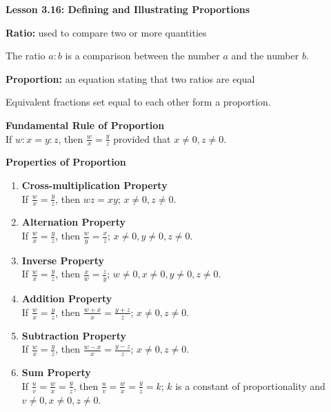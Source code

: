 \begin{center}
\textbf{Lesson 3.16: Defining and Illustrating Proportions}
\end{center}

\vspace*{-1.5ex}

\noindent \textbf{Ratio:} used to compare two or more quantities

The ratio \(a:b\) is a comparison between the number \(a\) and the number \(b\).

\noindent \textbf{Proportion:} an equation stating that two ratios are equal

Equivalent fractions set equal to each other form a proportion. 

\noindent\textbf{Fundamental Rule of Proportion}\\
If \( w : x = y : z \), then \( \tfrac{w}{x} = \tfrac{y}{z} \) provided that \( x \neq 0, z \neq 0 \).

\noindent\textbf{Properties of Proportion}
\begin{enumerate}
    \item \textbf{Cross-multiplication Property}\\
    If \( \tfrac{w}{x} = \tfrac{y}{z} \), then \( wz = xy \); \( x \neq 0, z \neq 0 \).

    \item \textbf{Alternation Property}\\
    If \( \tfrac{w}{x} = \tfrac{y}{z} \), then \( \tfrac{w}{y} = \tfrac{x}{z} \); \( x \neq 0, y \neq 0, z \neq 0 \).

    \item \textbf{Inverse Property}\\
    If \( \tfrac{w}{x} = \tfrac{y}{z} \), then \( \tfrac{x}{w} = \tfrac{z}{y} \); \( w \neq 0, x \neq 0, y \neq 0, z \neq 0 \).

    \item \textbf{Addition Property}\\
    If \( \tfrac{w}{x} = \tfrac{y}{z} \), then \( \tfrac{w + x}{x} = \tfrac{y + z}{z} \); \( x \neq 0, z \neq 0 \).

    \item \textbf{Subtraction Property}\\
    If \( \tfrac{w}{x} = \tfrac{y}{z} \), then \( \tfrac{w - x}{x} = \tfrac{y - z}{z} \); \( x \neq 0, z \neq 0 \).

    \item \textbf{Sum Property}\\
    If \( \tfrac{u}{v} = \tfrac{w}{x} = \tfrac{y}{z} \), then \( \tfrac{u}{v} = \tfrac{w}{x} = \tfrac{y}{z} = k \); \( k \) is a constant of proportionality and \( v \neq 0, x \neq 0, z \neq 0 \).
    
\end{enumerate}
